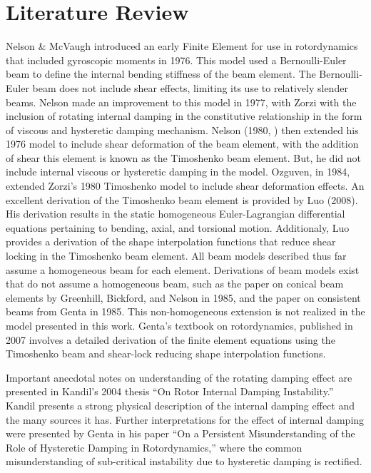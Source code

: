 \section{Literature Review}\label{LiteratureReview}
Nelson \& McVaugh \cite{nelson1976dynamics} introduced an early Finite Element for use in rotordynamics that included gyroscopic moments in 1976. This model used a Bernoulli-Euler beam to define the internal bending stiffness of the beam element. The Bernoulli-Euler beam does not include shear effects, limiting its use to relatively slender beams. Nelson made an improvement to this model in 1977, with Zorzi \cite{zorzi1977finite} with the inclusion of rotating internal damping in the constitutive relationship in the form of viscous and hysteretic damping mechanism. Nelson (1980, \cite{nelson1980finite}) then extended his 1976 model to include shear deformation of the beam element, with the addition of shear this element is known as the Timoshenko beam element. But, he did not include internal viscous or hysteretic damping in the model. Ozguven, in 1984\cite{ozguven1984whirl}, extended Zorzi's 1980 Timoshenko model to include shear deformation effects.  An excellent derivation of the Timoshenko beam element is provided by Luo (2008)\cite{luo2008efficient}. His derivation results in the static homogeneous Euler-Lagrangian differential equations pertaining to bending, axial, and torsional motion. Additionaly, Luo provides a derivation of the shape interpolation functions that reduce shear locking in the Timoshenko beam element. All beam models described thus far assume a homogeneous beam for each element. Derivations of beam models exist that do not assume a homogeneous beam, such as the paper on conical beam elements by Greenhill, Bickford, and Nelson in 1985\cite{greenhill1985conical}, and the paper on consistent beams from Genta in 1985\cite{genta1985consistent}. This non-homogeneous extension is not realized in the model presented in this work. Genta's textbook on rotordynamics, published in 2007\cite{genta2007dynamics} involves a detailed derivation of the finite element equations using the Timoshenko beam and shear-lock reducing shape interpolation functions.\par 
Important anecdotal notes on understanding of the rotating damping effect are presented in Kandil's 2004\cite{kandil2005rotor} thesis ``On Rotor Internal Damping Instability.'' Kandil presents a strong physical description of the internal damping effect and the many sources it has. Further interpretations for the effect of internal damping were presented by Genta in his paper ``On a Persistent Misunderstanding of the Role of Hysteretic Damping in Rotordynamics,'' where the common misunderstanding of sub-critical instability due to hysteretic damping is rectified.\par 
